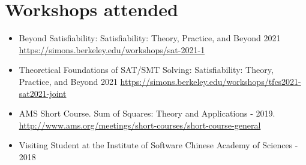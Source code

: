 \section{Workshops attended}

\begin{itemize}
  \item Beyond Satisfiability: Satisfiability: 
    Theory, Practice, and Beyond 2021 
    \url{https://simons.berkeley.edu/workshops/sat-2021-1}
  \item Theoretical Foundations of SAT/SMT Solving: 
    Satisfiability: Theory, Practice, and Beyond 2021
    \url{https://simons.berkeley.edu/workshops/tfcs2021-sat2021-joint}
  \item AMS Short Course. Sum of Squares: Theory and Applications - 2019.
    \url{http://www.ams.org/meetings/short-courses/short-course-general}
  \item Visiting Student at the Institute of Software Chinese
    Academy of Sciences - 2018
\end{itemize}

